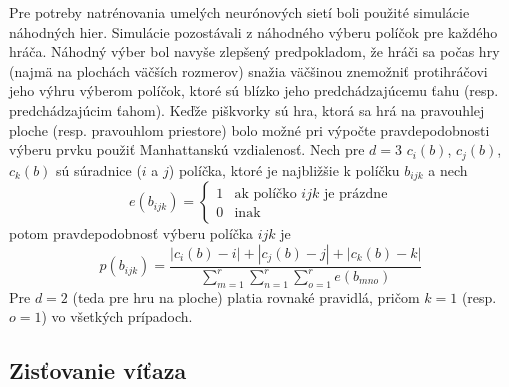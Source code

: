 Pre potreby natrénovania umelých neurónových sietí boli použité simulácie náhodných hier.
Simulácie pozostávali z náhodného výberu políčok pre každého hráča.
Náhodný výber bol navyše zlepšený predpokladom, že hráči sa počas hry (najmä na plochách väčších rozmerov) snažia
väčšinou znemožniť protihráčovi jeho výhru výberom políčok, ktoré sú blízko jeho predchádzajúcemu ťahu
(resp. predchádzajúcim ťahom).
Keďže piškvorky sú hra, ktorá sa hrá na pravouhlej ploche (resp. pravouhlom priestore) bolo možné pri výpočte
pravdepodobnosti výberu prvku použiť Manhattanskú vzdialenosť.
Nech pre $d=3$ $c_i(b)$, $c_j(b)$, $c_k(b)$ sú súradnice ($i$ a $j$) políčka, ktoré je najbližšie k políčku $b_{ijk}$ a
nech
\begin{equation}
    e(b_{ijk}) =
    \begin{cases}
        1 & \text{ak políčko }ijk\text{ je prázdne} \\
        0 & \text{inak}
    \end{cases}
\end{equation}
potom pravdepodobnosť výberu políčka $ijk$ je
\begin{equation}
    p(b_{ijk}) = \frac{|c_i(b) - i| + |c_j(b) - j| + |c_k(b) - k|}{\sum_{m=1}^r\sum_{n=1}^r\sum_{o=1}^r e(b_{mno})}
\end{equation}
Pre $d=2$ (teda pre hru na ploche) platia rovnaké pravidlá, pričom $k=1$ (resp. $o=1$) vo všetkých prípadoch.

\subsection{Zisťovanie víťaza}\label{subsec:checking-winner}

